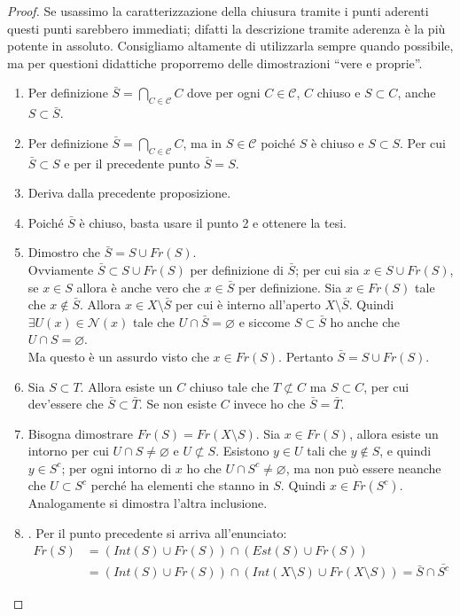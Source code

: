 \begin{proof} Se usassimo la caratterizzazione della chiusura tramite i punti aderenti questi punti sarebbero immediati; difatti la descrizione tramite aderenza è la più potente in assoluto. Consigliamo altamente di utilizzarla sempre quando possibile, ma per questioni didattiche proporremo delle dimostrazioni \enquote{vere e proprie}.
	\begin{enumerate} 
		\item Per definizione $\bar{S} = \bigcap_{C \in \mathcal{C}} C$ dove per ogni $C \in \mathcal{C}$, $C$ chiuso e $S \subset C$, anche $S \subset \bar{S}$.
		\item Per definizione $\bar{S} = \bigcap_{C \in \mathcal{C}} C$, ma in $S \in \mathcal{C}$ poiché $S$ è chiuso e $S \subset S$. Per cui $\bar{S} \subset S$ e per il precedente punto $\bar{S} = S$.
		\item Deriva dalla precedente proposizione.
		\item Poiché $\bar{S}$ è chiuso, basta usare il punto 2 e ottenere la tesi.
		\item Dimostro che $\bar{S}= S \cup Fr(S)$. \\ Ovviamente $\bar{S} \subset S \cup Fr(S)$ per definizione di $\bar{S}$; per cui sia $x \in S \cup Fr(S)$, se $x \in S$ allora è anche vero che $x \in \bar{S}$ per definizione. Sia $x \in Fr(S)$ tale che $x \notin \bar{S}$. Allora $x \in X \setminus \bar{S}$ per cui è interno all'aperto $X \setminus \bar{S}$. Quindi $\exists U(x) \in \mathcal{N}(x)$ tale che $U \cap \bar{S} = \varnothing$ e siccome $S \subset \bar{S}$ ho anche che $U \cap S = \varnothing$. \\ Ma questo è un assurdo visto che $x \in Fr(S)$. Pertanto $\bar{S} = S \cup Fr(S)$.
		\item Sia $S \subset T$. Allora esiste un $C$ chiuso tale che $T \not\subset C$ ma $S \subset C$, per cui dev'essere che $\bar{S} \subset \bar{T}$. Se non esiste $C$ invece ho che $\bar{S} = \bar{T}$.
		\item Bisogna dimostrare $Fr(S)= Fr(X \setminus S)$. Sia $x \in Fr(S)$, allora esiste un intorno per cui $U \cap S \neq \varnothing$ e $U \not\subset S$. Esistono $y\in U$ tali che $y \notin S$, e quindi $y \in S^c$; per ogni intorno di $x$ ho che $U \cap S^c \neq \varnothing$, ma non può essere neanche che $U \subset S^c$ perché ha elementi che stanno in $S$. Quindi $x \in Fr(S^c)$. Analogamente si dimostra l'altra inclusione.  
		\item . Per il punto precedente si arriva all'enunciato:
		\begin{align*}
			Fr(S) & = (Int(S) \cup Fr(S)) \cap (Est(S) \cup Fr(S)) \\
					& = (Int(S) \cup Fr(S)) \cap (Int(X \setminus S) \cup Fr(X \setminus S)) = \bar{S} \cap \bar{S^c} 
		\end{align*}
	\end{enumerate}
\end{proof}

